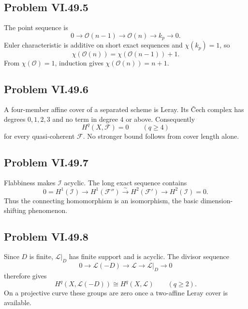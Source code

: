 \subsection*{Problem VI.49.5}
\begin{solution}
The point sequence is
\[
0\to\mathcal O(n-1)\to\mathcal O(n)\to k_p\to0.
\]
Euler characteristic is additive on short exact sequences and \(\chi(k_p)=1\), so
\[
\chi(\mathcal O(n))=\chi(\mathcal O(n-1))+1.
\]
From \(\chi(\mathcal O)=1\), induction gives \(\chi(\mathcal O(n))=n+1\).
\end{solution}

\subsection*{Problem VI.49.6}
\begin{solution}
A four-member affine cover of a separated scheme is Leray.  Its Čech complex has degrees \(0,1,2,3\) and no term in degree \(4\) or above.  Consequently
\[
H^q(X,\mathcal F)=0\qquad(q\ge4)
\]
for every quasi-coherent \(\mathcal F\).  No stronger bound follows from cover length alone.
\end{solution}

\subsection*{Problem VI.49.7}
\begin{solution}
Flabbiness makes \(\mathcal I\) acyclic.  The long exact sequence contains
\[
0=H^1(\mathcal I)\to H^1(\mathcal F'')\xrightarrow{\sim}
H^2(\mathcal F')\to H^2(\mathcal I)=0.
\]
Thus the connecting homomorphism is an isomorphism, the basic dimension-shifting phenomenon.
\end{solution}

\subsection*{Problem VI.49.8}
\begin{solution}
Since \(D\) is finite, \(\mathcal L|_D\) has finite support and is acyclic.  The divisor sequence
\[
0\to\mathcal L(-D)\to\mathcal L\to\mathcal L|_D\to0
\]
therefore gives
\[
H^q(X,\mathcal L(-D))\cong H^q(X,\mathcal L)\qquad(q\ge2).
\]
On a projective curve these groups are zero once a two-affine Leray cover is available.
\end{solution}

